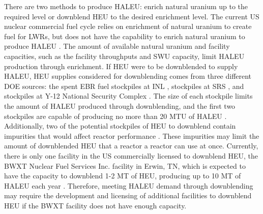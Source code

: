 There are two methods to produce \gls{HALEU}: enrich natural uranium up to 
the required level
or downblend \acrfull{HEU} to the desired enrichment level. The current US
nuclear commercial fuel cycle relies on enrichment of natural uranium 
to create fuel for \glspl{LWR}, but does not have the capability to enrich
natural uranium to produce \gls{HALEU} \cite{nuclear_energy_institute_addressing_2018}.  
The amount of available natural uranium and facility capacities, such 
as the facility throughputs and \acrfull{SWU} capacity, limit 
\gls{HALEU} production through enrichment. If \gls{HEU} were to be 
downblended to supply \gls{HALEU}, \gls{HEU} supplies
considered for downblending comes from three different 
\gls{DOE} sources: the spent \gls{EBR} fuel stockpiles at \gls{INL} 
\cite{patterson_haleu_2019}, stockpiles at \gls{SRS} \cite{regalbuto_addressing_2020}, 
and stockpiles at Y-12 National Security Complex 
\cite{robinson_establishment_2020}. The size of each stockpile limits the amount 
of \gls{HALEU} produced through downblending, and the first two stockpiles 
are capable of producing no more than 20 MTU of \gls{HALEU}
\cite{regalbuto_addressing_2020}.
Additionally, two of the potential stockpiles of \gls{HEU} to downblend  
contain impurities that would affect reactor performance 
\cite{vaden_isotopic_2018,nelson_foreign_2010}.
These impurities may limit the amount of downblended \gls{HEU} that a reactor 
a reactor can use at once. 
Currently, there is only one facility in the US commercially licensed to 
downblend \gls{HEU}, the BWXT Nuclear Fuel Services Inc. facility in 
Erwin, TN, which is expected to have the capacity to downblend 1-2 
MT of \gls{HEU}, producing up to 10 MT of \gls{HALEU} each year \cite{nagley_ha-leu_2020}.
Therefore, meeting \gls{HALEU} demand through downblending may require the 
development and licensing of additional facilities to downblend \gls{HEU} if 
the BWXT facility does not have enough capacity. 

